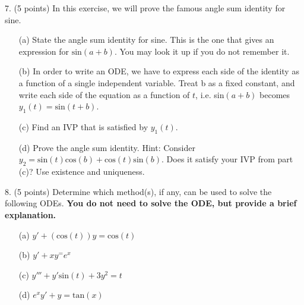 \documentclass[12pt,letterpaper]{hmcpset}
\begin{document}
\begin{problem}
7. (5 points) In this exercise, we will prove the famous angle sum identity for sine.

\begin{enumerate}
    \item[(a)] State the angle sum identity for sine. This is the one that gives an expression for
$\text{sin}(a + b)$. You may look it up if you do not remember it.
    \item[(b)] In order to write an ODE, we have to express each side of the identity as a function of
a single independent variable. Treat b as a fixed constant, and write each side of the
equation as a function of $t$, i.e. sin$(a + b)$ becomes $y_1(t) = \text{sin}(t + b)$.
    \item[(c)] Find an IVP that is satisfied by $y_1(t)$.
    \item[(d)] Prove the angle sum identity. Hint: Consider $y_2 = \text{sin}(t) \text{cos} (b)+ \text{cos}(t)\text{sin}(b)$. Does it satisfy
your IVP from part (c)? Use existence and uniqueness.
\end{enumerate}
\end{problem}
\newpage

\begin{problem}
8. (5 points) Determine which method(s), if any, can be used to solve the following ODEs. \textbf{You
do not need to solve the ODE, but provide a brief explanation.}

\begin{enumerate}
    \item[(a)] $y' + (\text{cos}(t))y = \text{cos}(t)$
    \item[(b)] $y'+ xy^ = e^x$
    \item[(c)]$y'''+ y'\text{sin}(t) + 3y^2 = t$
    \item[(d)]$e^xy' + y = \text{tan}(x)$
\end{enumerate}
\end{problem}
\newpage

\end{document}
